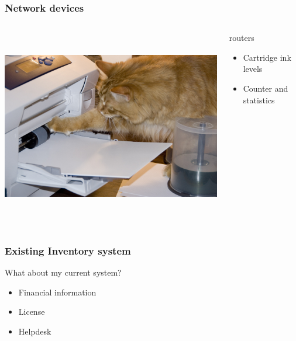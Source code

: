 \documentclass{beamer}
\begin{document}
\begin{frame}

    \frametitle{Network devices}


 \begin{columns}
 \begin{column}{0.15\textwidth}
         \includegraphics[height=8.5cm]{./pics/printer.jpg}
 \end{column}
 \begin{column}{1.25\textwidth}
    

    \begin{block}{routers}
        \begin{itemize}
            \item Cartridge ink levels
            \item Counter and statistics
        \end{itemize}
    \end{block}

 \end{column}
\end{columns}
\end{frame}



\begin{frame}




    \frametitle{Existing Inventory system}

 
    \begin{block}{What about my current system?}
        \begin{itemize}
            \item Financial information
            \item License
            \item Helpdesk
        \end{itemize}
    \end{block}
   

\end{frame}
\end{document}

